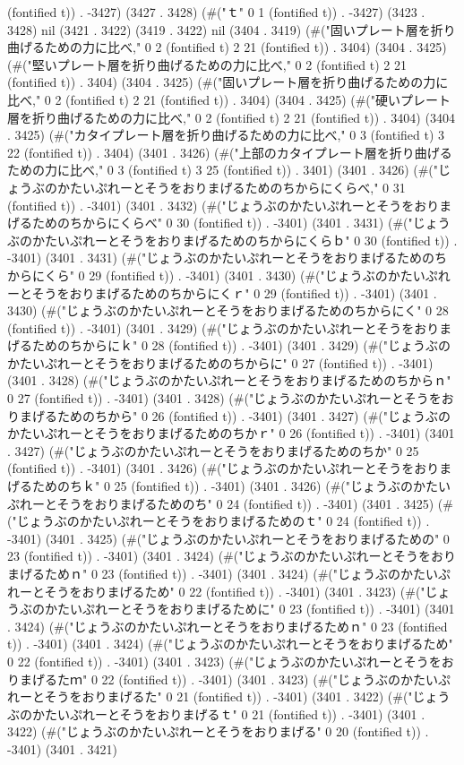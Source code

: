 (fontified t)) . -3427) (3427 . 3428) (#("ｔ" 0 1 (fontified t)) . -3427) (3423 . 3428) nil (3421 . 3422) (3419 . 3422) nil (3404 . 3419) (#("固いプレート層を折り曲げるための力に比べ," 0 2 (fontified t) 2 21 (fontified t)) . 3404) (3404 . 3425) (#("堅いプレート層を折り曲げるための力に比べ," 0 2 (fontified t) 2 21 (fontified t)) . 3404) (3404 . 3425) (#("固いプレート層を折り曲げるための力に比べ," 0 2 (fontified t) 2 21 (fontified t)) . 3404) (3404 . 3425) (#("硬いプレート層を折り曲げるための力に比べ," 0 2 (fontified t) 2 21 (fontified t)) . 3404) (3404 . 3425) (#("カタイプレート層を折り曲げるための力に比べ," 0 3 (fontified t) 3 22 (fontified t)) . 3404) (3401 . 3426) (#("上部のカタイプレート層を折り曲げるための力に比べ," 0 3 (fontified t) 3 25 (fontified t)) . 3401) (3401 . 3426) (#("じょうぶのかたいぷれーとそうをおりまげるためのちからにくらべ," 0 31 (fontified t)) . -3401) (3401 . 3432) (#("じょうぶのかたいぷれーとそうをおりまげるためのちからにくらべ" 0 30 (fontified t)) . -3401) (3401 . 3431) (#("じょうぶのかたいぷれーとそうをおりまげるためのちからにくらｂ" 0 30 (fontified t)) . -3401) (3401 . 3431) (#("じょうぶのかたいぷれーとそうをおりまげるためのちからにくら" 0 29 (fontified t)) . -3401) (3401 . 3430) (#("じょうぶのかたいぷれーとそうをおりまげるためのちからにくｒ" 0 29 (fontified t)) . -3401) (3401 . 3430) (#("じょうぶのかたいぷれーとそうをおりまげるためのちからにく" 0 28 (fontified t)) . -3401) (3401 . 3429) (#("じょうぶのかたいぷれーとそうをおりまげるためのちからにｋ" 0 28 (fontified t)) . -3401) (3401 . 3429) (#("じょうぶのかたいぷれーとそうをおりまげるためのちからに" 0 27 (fontified t)) . -3401) (3401 . 3428) (#("じょうぶのかたいぷれーとそうをおりまげるためのちからｎ" 0 27 (fontified t)) . -3401) (3401 . 3428) (#("じょうぶのかたいぷれーとそうをおりまげるためのちから" 0 26 (fontified t)) . -3401) (3401 . 3427) (#("じょうぶのかたいぷれーとそうをおりまげるためのちかｒ" 0 26 (fontified t)) . -3401) (3401 . 3427) (#("じょうぶのかたいぷれーとそうをおりまげるためのちか" 0 25 (fontified t)) . -3401) (3401 . 3426) (#("じょうぶのかたいぷれーとそうをおりまげるためのちｋ" 0 25 (fontified t)) . -3401) (3401 . 3426) (#("じょうぶのかたいぷれーとそうをおりまげるためのち" 0 24 (fontified t)) . -3401) (3401 . 3425) (#("じょうぶのかたいぷれーとそうをおりまげるためのｔ" 0 24 (fontified t)) . -3401) (3401 . 3425) (#("じょうぶのかたいぷれーとそうをおりまげるための" 0 23 (fontified t)) . -3401) (3401 . 3424) (#("じょうぶのかたいぷれーとそうをおりまげるためｎ" 0 23 (fontified t)) . -3401) (3401 . 3424) (#("じょうぶのかたいぷれーとそうをおりまげるため" 0 22 (fontified t)) . -3401) (3401 . 3423) (#("じょうぶのかたいぷれーとそうをおりまげるために" 0 23 (fontified t)) . -3401) (3401 . 3424) (#("じょうぶのかたいぷれーとそうをおりまげるためｎ" 0 23 (fontified t)) . -3401) (3401 . 3424) (#("じょうぶのかたいぷれーとそうをおりまげるため" 0 22 (fontified t)) . -3401) (3401 . 3423) (#("じょうぶのかたいぷれーとそうをおりまげるたｍ" 0 22 (fontified t)) . -3401) (3401 . 3423) (#("じょうぶのかたいぷれーとそうをおりまげるた" 0 21 (fontified t)) . -3401) (3401 . 3422) (#("じょうぶのかたいぷれーとそうをおりまげるｔ" 0 21 (fontified t)) . -3401) (3401 . 3422) (#("じょうぶのかたいぷれーとそうをおりまげる" 0 20 (fontified t)) . -3401) (3401 . 3421) 